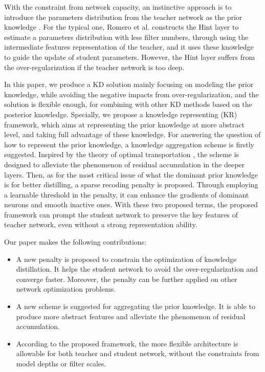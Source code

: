 \documentclass[10pt,twocolumn,letterpaper]{article}
\begin{document}
With the constraint from network capacity,
an instinctive approach is to
introduce the parameters distribution \cite{denil2013predicting} from the teacher network
as the prior knowledge \cite{Romero2014FitNets, yim2017gift}.
For the typical one,
Romero et al. \cite{Romero2014FitNets} constructs the Hint layer
to estimate a parameters distribution with less filter numbers,
through using the intermediate features representation of the teacher,
and it uses these knowledge to guide the update of student parameters.
However,
the Hint layer suffers from the over-regularization if the teacher network is too deep.


In this paper,
we produce a KD solution mainly focusing on modeling the prior knowledge,
while avoiding the negative impacts from over-regularization,
and the solution is flexible enough,
for combining with other KD methods based on the posterior knowledge.
Specially,
we propose a knowledge representing (KR) framework,
which aims at representing the prior knowledge at more abstract level,
and taking full advantage of these knowledge.
For answering the question of
how to represent the prior knowledge,
a knowledge aggregation scheme is firstly suggested.
Inspired by the theory of optimal transportation \cite{Martin2017, Na2017A},
the scheme is designed to alleviate the phenomenon of
residual accumulation in the deeper layers.
Then,
as for the most critical issue of
what the dominant prior knowledge is for better distilling,
a sparse recoding penalty is proposed.
Through employing a learnable threshold in the penalty,
it can enhance the gradients of dominant neurons
and smooth inactive ones.
With these two proposed terms,
the proposed framework can prompt the student network
to preserve the key features of teacher network,
even without a strong representation ability.

Our paper makes the following contributions:
\begin{itemize}
\item A new penalty is proposed to constrain the optimization of knowledge distillation. It helps the student network to avoid the over-regularization and converge faster. Moreover, the penalty can be further applied on other network optimization problems.
\item A new scheme is suggested for aggregating the prior knowledge. It is able to produce more abstract features and alleviate the phenomenon of residual accumulation.
\item According to the proposed framework, the more flexible architecture is allowable for both teacher and student network, without the constraints from model depths or filter scales.
\end{itemize}
\end{document}

